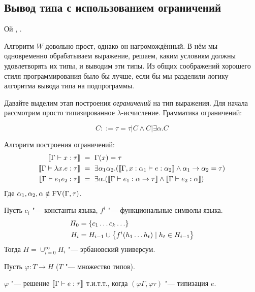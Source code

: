 \subsection*{\texorpdfstring{Вывод типа с использованием ограничений}{Constraint-based type inference}}

Ой \todo, \todo.

Алгоритм $W$ довольно прост, однако он нагромождённый.
В нём мы одновременно обрабатываем выражение, решаем, каким условиям должны удовлетворять их типы, и выводим эти типы.
Из общих соображений хорошего стиля программирования было бы лучше,
если бы мы разделили логику алгоритма вывода типа на подпрограммы.

Давайте выделим этап построения \emph{ограничений} на тип выражения.
Для начала рассмотрим просто типизированное $\lambda$-исчисление.
Грамматика ограничений:
\begin{bnf}
\[
    C ::= \tau = \tau | C \land C | \exists \alpha . C
\]
\end{bnf}%
Алгоритм построения ограничений:
\begin{align*}
    \restr{\Gamma \vdash x : \tau} \ &=\  \Gamma(x) = \tau \\
    \restr{\Gamma \vdash \lambda x . e : \tau} \ &=\ 
        \exists \alpha_1 \alpha_2 . (\restr{\Gamma, x : \alpha_1\vdash e:\alpha_2} \land \alpha_1\to\alpha_2=\tau) \\
    \restr{\Gamma \vdash e_1 e_2 : \tau} \ &=\ 
        \exists\alpha.(\restr{\Gamma\vdash e_1 :\alpha\to\tau} \land \restr{\Gamma\vdash e_2 : \alpha})
\end{align*}
Где $\alpha_1, \alpha_2, \alpha \notin \operatorname{FV}(\Gamma, \tau)$.

\begin{definition}
    Пусть $c_i$ "--- константы языка, $f^i$ "--- функциональные символы языка.
    \begin{align*}
        H_0 &= \left\{c_1 \ldots c_k \ldots\right\} \\
        H_i &= H_{i-1} \cup \left\{f^i(h_1 \ldots h_t) \mid h_t \in H_{i-1}\right\}
    \end{align*}
    Тогда $H = \cup_{i=0}^{\infty} H_i$ "--- эрбановский универсум.
\end{definition}

Пусть $\varphi : T \to H$ ($T$ "--- множество типов).

\begin{theorem}
    $\varphi$ "--- решение $\llbracket\Gamma\vdash e : \tau\rrbracket$ т.и.т.т., когда $(\varphi\Gamma, \varphi\tau)$ "--- типизация $e$.
\end{theorem}

